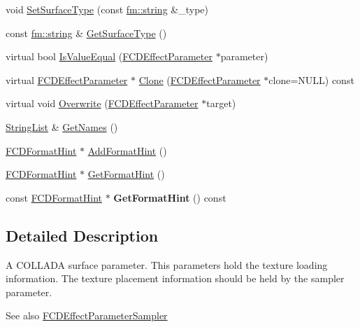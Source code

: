 \begin{DoxyCompactItemize}
\item 
void \hyperlink{classFCDEffectParameterSurface_ab4be08c0a8e19ee4fdf54cedca4b5403}{SetSurfaceType} (const \hyperlink{classfm_1_1stringT}{fm::string} \&\_\-type)
\item 
const \hyperlink{classfm_1_1stringT}{fm::string} \& \hyperlink{classFCDEffectParameterSurface_a30e2fd6698aa20b749a300c7c9cc60f0}{GetSurfaceType} ()
\item 
virtual bool \hyperlink{classFCDEffectParameterSurface_a39896f512054cc2bb9fa8938fa67ab80}{IsValueEqual} (\hyperlink{classFCDEffectParameter}{FCDEffectParameter} $\ast$parameter)
\item 
virtual \hyperlink{classFCDEffectParameter}{FCDEffectParameter} $\ast$ \hyperlink{classFCDEffectParameterSurface_a0b95f01b907cb82af8cb84106d227cf3}{Clone} (\hyperlink{classFCDEffectParameter}{FCDEffectParameter} $\ast$clone=NULL) const 
\item 
virtual void \hyperlink{classFCDEffectParameterSurface_a3079626698cf949faf90030b3d6230e2}{Overwrite} (\hyperlink{classFCDEffectParameter}{FCDEffectParameter} $\ast$target)
\item 
\hyperlink{classfm_1_1vector}{StringList} \& \hyperlink{classFCDEffectParameterSurface_a84c69ff8e75ff4d76e033cf33b3bd768}{GetNames} ()
\item 
\hyperlink{structFCDFormatHint}{FCDFormatHint} $\ast$ \hyperlink{classFCDEffectParameterSurface_a19a153fcabe4cf75b34201d436e1ae54}{AddFormatHint} ()
\item 
\hyperlink{structFCDFormatHint}{FCDFormatHint} $\ast$ \hyperlink{classFCDEffectParameterSurface_a59783a6fd9d677e81a824e6d4cf33ccb}{GetFormatHint} ()
\item 
\hypertarget{classFCDEffectParameterSurface_af30b3c8202dd63dd751a0d54993dad2e}{
const \hyperlink{structFCDFormatHint}{FCDFormatHint} $\ast$ {\bfseries GetFormatHint} () const }
\label{classFCDEffectParameterSurface_af30b3c8202dd63dd751a0d54993dad2e}

\end{DoxyCompactItemize}


\subsection{Detailed Description}
A COLLADA surface parameter. This parameters hold the texture loading information. The texture placement information should be held by the sampler parameter.

\begin{DoxySeeAlso}{See also}
\hyperlink{classFCDEffectParameterSampler}{FCDEffectParameterSampler} 
\end{DoxySeeAlso}



